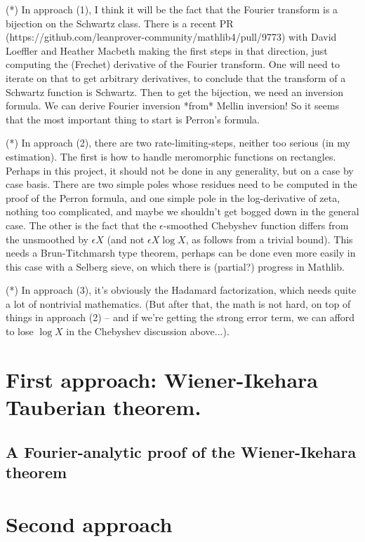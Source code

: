 \documentclass{report}
\theoremstyle{definition}
\begin{document}
(*) In approach (1), I think it will be the fact that the Fourier transform is a bijection on the Schwartz class. There is a recent PR (https://github.com/leanprover-community/mathlib4/pull/9773) with David Loeffler and Heather Macbeth making the first steps in that direction, just computing the (Frechet) derivative of the Fourier transform. One will need to iterate on that to get arbitrary derivatives, to conclude that the transform of a Schwartz function is Schwartz. Then to get the bijection, we need an inversion formula. We can derive Fourier inversion *from* Mellin inversion! So it seems that the most important thing to start is Perron's formula.

(*) In approach (2), there are two rate-limiting-steps, neither too serious (in my estimation). The first is how to handle meromorphic functions on rectangles. Perhaps in this project, it should not be done in any generality, but on a case by case basis. There are two simple poles whose residues need to be computed in the proof of the Perron formula, and one simple pole in the log-derivative of zeta, nothing too complicated, and maybe we shouldn't get bogged down in the general case. The other is the fact that the $\epsilon$-smoothed Chebyshev function differs from the unsmoothed by $\epsilon X$ (and not $\epsilon X \log X$, as follows from a trivial bound). This needs a Brun-Titchmarsh type theorem, perhaps can be done even more easily in this case with a Selberg sieve, on which there is (partial?) progress in Mathlib.

(*) In approach (3), it's obviously the Hadamard factorization, which needs quite a lot of nontrivial mathematics. (But after that, the math is not hard, on top of things in approach (2) -- and if we're getting the strong error term, we can afford to lose $\log X$ in the Chebyshev discussion above...).

\chapter{First approach: Wiener-Ikehara Tauberian theorem.}

\section{A Fourier-analytic proof of the Wiener-Ikehara theorem}


\chapter{Second approach}
\end{document}
